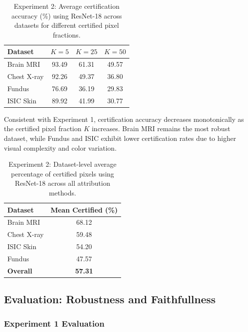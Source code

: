 \documentclass[11pt]{article}
\begin{document}
\begin{table}[h!]
\begin{table}[H]
\centering
\caption{Experiment 2: Average certification accuracy (\%) using ResNet-18 across datasets for different certified pixel fractions.}
\label{tab:exp2_kwise}
\begin{tabular}{lccc}
\toprule
\textbf{Dataset} & $K=5$ & $K=25$ & $K=50$ \\
\midrule
Brain MRI   & 93.49 & 61.31 & 49.57 \\
Chest X-ray & 92.26 & 49.37 & 36.80 \\
Fundus     & 76.69 & 36.19 & 29.83 \\
ISIC Skin  & 89.92 & 41.99 & 30.77 \\
\bottomrule
\end{tabular}
\end{table}

Consistent with Experiment 1, certification accuracy decreases monotonically as the certified pixel fraction $K$ increases. Brain MRI remains the most robust dataset, while Fundus and ISIC exhibit lower certification rates due to higher visual complexity and color variation.

\begin{table}[H]
\centering
\caption{Experiment 2: Dataset-level average percentage of certified pixels using ResNet-18 across all attribution methods.}
\label{tab:exp2_dataset_avg}
\begin{tabular}{lc}
\toprule
\textbf{Dataset} & \textbf{Mean Certified (\%)} \\
\midrule
Brain MRI   & 68.12 \\
Chest X-ray & 59.48 \\
ISIC Skin  & 54.20 \\
Fundus     & 47.57 \\
\midrule
\textbf{Overall} & \textbf{57.31} \\
\bottomrule
\end{tabular}
\end{table}


\subsection{Evaluation: Robustness and Faithfullness}

\subsubsection{Experiment 1 Evaluation}
\begin{figure}[h!]
\centering


\end{figure}
\end{table}
\end{document}

